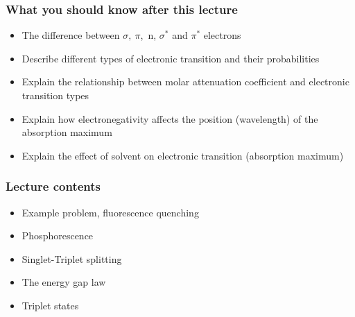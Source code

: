\documentclass[ignorenonframetext]{beamer}
\begin{document}
\begin{frame}
\frametitle{What you should know after this lecture}
\begin{itemize}
\item The difference between \(\sigma,\  \pi\),\ n, \(\sigma^*\) and \(\pi^*\) electrons
\item Describe different types of electronic transition and their probabilities
\item Explain the relationship between molar attenuation coefficient and electronic transition types
\item Explain how electronegativity affects the position (wavelength) of the absorption maximum
\item Explain the effect of solvent on electronic transition (absorption maximum)
\end{itemize}
\end{frame}

\begin{frame}
	\frametitle{Lecture contents}
		\begin{itemize}
			\item Example problem, fluorescence quenching
			\item Phosphorescence
			\item Singlet-Triplet splitting
			\item The energy gap law
			\item Triplet states
		\end{itemize}
	\end{frame}
\end{document}
